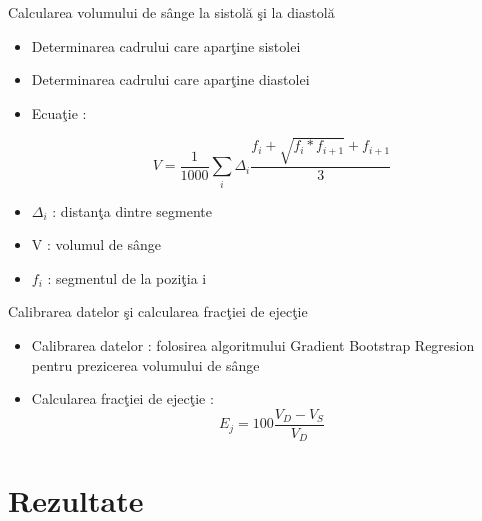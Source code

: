 \documentclass[xcolor=svgnames,handout]{beamer}
\begin{document}
 \begin{frame}
    {Calcularea volumului de s\^{a}nge la sistol\u{a} \c{s}i la diastol\u{a}}
  \begin{itemize}
    \item Determinarea cadrului care apar\c{t}ine sistolei
    \item Determinarea cadrului care apar\c{t}ine diastolei
    \item Ecua\c{t}ie :
    
    \begin{equation*}
    V = \frac{1}{1000} \sum_i \Delta_i \frac{f_i + \sqrt{f_i * f_{i+1}} + f_{i+1}}{3}
    \end{equation*}
    \item $\Delta_i$ : distan\c{t}a dintre segmente
    \item V : volumul de s\^{a}nge
    \item $f_i$ : segmentul de la pozi\c{t}ia i
  \end{itemize}
  \end{frame}
    
    \begin{frame}
    {Calibrarea datelor \c{s}i calcularea frac\c{t}iei de ejec\c{t}ie}
    \begin{itemize}
        \item Calibrarea datelor : folosirea algoritmului Gradient Bootstrap Regresion pentru prezicerea volumului de s\^{a}nge
        \item Calcularea frac\c{t}iei de ejec\c{t}ie :
            \begin{equation*}
      E_{j} = 100 \frac{V_D - V_S}{V_D}
    \end{equation*}        
    \end{itemize}
  \end{frame}
    
    \section
  {Rezultate}
    
\end{document}
